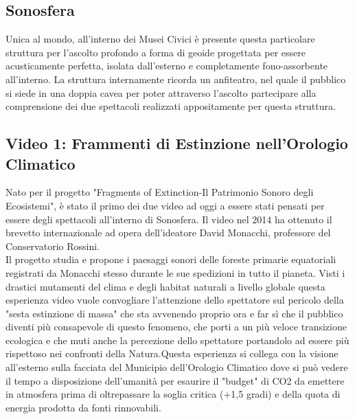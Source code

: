\documentclass[hidelinks,12pt,a4paper]{article}
\begin{document}
\begin{flushleft}
		\section{Sonosfera}
		Unica al mondo, all'interno dei Musei Civici è presente questa particolare struttura per l'ascolto profondo a forma di geoide progettata per essere acusticamente perfetta, isolata dall'esterno e completamente fono-assorbente all'interno. La struttura internamente ricorda un anfiteatro, nel quale il pubblico si siede in una doppia cavea per poter attraverso l'ascolto partecipare alla comprensione dei due spettacoli realizzati appositamente per questa struttura.
		
		\subsection{Video 1: Frammenti di Estinzione nell'Orologio Climatico}
		Nato per il progetto "Fragments of Extinction-Il Patrimonio Sonoro degli Ecosistemi", è stato il primo dei due video ad oggi a essere stati pensati per essere degli spettacoli all'interno di Sonosfera. Il video nel 2014 ha ottenuto il brevetto internazionale ad opera dell'ideatore David Monacchi, professore del Conservatorio Rossini.\\
		Il progetto studia e propone i paesaggi sonori delle foreste primarie equatoriali registrati da Monacchi stesso durante le sue spedizioni in tutto il pianeta. Visti i drastici mutamenti del clima e degli habitat naturali a livello globale questa esperienza video vuole convogliare l'attenzione dello spettatore sul pericolo della "sesta estinzione di massa" che sta avvenendo proprio ora e far sì che il pubblico diventi più consapevole di questo fenomeno, che porti a un più veloce transizione ecologica e che muti anche la percezione dello spettatore portandolo ad essere più rispettoso nei confronti della Natura.Questa esperienza si collega con la visione all'esterno sulla facciata del Municipio dell'Orologio Climatico dove si può vedere il tempo a disposizione dell'umanità per esaurire il "budget" di CO2 da emettere in atmosfera prima di oltrepassare la soglia critica (+1,5 gradi) e della quota di energia prodotta da fonti rinnovabili.
		

\end{flushleft}
\end{document}
